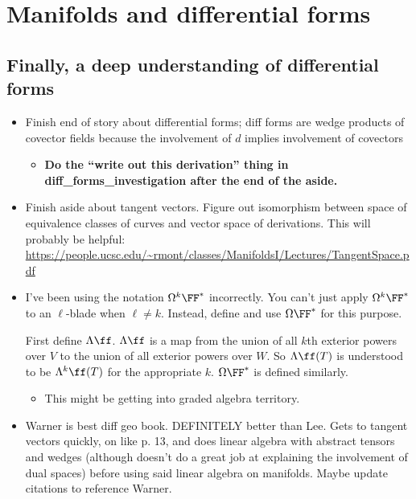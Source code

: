 \section*{Manifolds and differential forms}

\subsection*{Finally, a deep understanding of differential forms}

\begin{itemize}
    \item Finish end of story about differential forms; diff forms are wedge products of covector fields because the involvement of $d$ implies involvement of covectors
    \begin{itemize}
        \item \textbf{Do the ``write out this derivation'' thing in diff\_forms\_investigation after the end of the aside.}
    \end{itemize}
    \item Finish aside about tangent vectors. Figure out isomorphism between space of equivalence classes of curves and vector space of derivations. This will probably be helpful: \url{https://people.ucsc.edu/~rmont/classes/ManifoldsI/Lectures/TangentSpace.pdf}
    \item I've been using the notation $\Omega^k \FF^*$ incorrectly. You can't just apply $\Omega^k \FF^*$ to an $\ell$-blade when $\ell \neq k$. Instead, define and use $\Omega \FF^*$ for this purpose.
    
    First define $\Lambda \ff$. $\Lambda \ff$ is a map from the union of all $k$th exterior powers over $V$ to the union of all exterior powers over $W$. So $\Lambda \ff(T)$ is understood to be $\Lambda^k \ff(T)$ for the appropriate $k$. $\Omega \FF^*$ is defined similarly.
    \begin{itemize}
        \item  This might be getting into graded algebra territory.
    \end{itemize}    
    \item Warner is best diff geo book. DEFINITELY better than Lee. Gets to tangent vectors quickly, on like p. 13, and does linear algebra with abstract tensors and wedges (although doesn’t do a great job at explaining the involvement of dual spaces) before using said linear algebra on manifolds. Maybe update citations to reference Warner.
\end{itemize}

